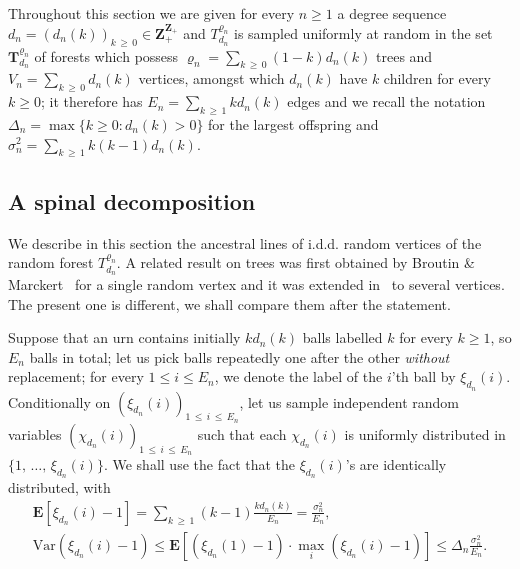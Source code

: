 \documentclass[10pt]{amsart}
\theoremstyle{definition}\newtheorem{defi}[theo]{Definition}\newtheorem{rema}[theo]{Remark}\newtheorem{exam}[theo]{Example}\newtheorem{exem}[theo]{Example}\newtheorem{nota}[theo]{Notation}
\newcommand{\ensembles}[1]{\mathbf{#1}}
\newcommand{\Z}{\ensembles{Z}}
\newcommand{\E}{\ensembles{E}}
\newcommand{\Es}[1]{\E\left[#1\right]}
\newcommand{\1}{\ensembles{1}}
\newcommand{\Tree}{\mathbf{T}}
\renewcommand{\le}{\leqslant}
\renewcommand{\ge}{\geqslant}
\newcommand{\Var}{\mathrm{Var}}
\newcommand{\Fn}{\Tree_{d_n}^{\varrho_n}}
\newcommand{\fn}{T_{d_n}^{\varrho_n}}
\newcommand{\edges}{E}
\newcommand{\vertices}{V}
\providecommand{\?}{}
\begin{document}
Throughout this section we are given for every $n \ge 1$ a degree sequence $d_n = (d_n(k))_{k\,\ge\,0} \in \Z_+^{\Z_+}$ and $\fn$ is sampled uniformly at random in the set $\Fn$ of forests which possess $\varrho_n = \sum_{k\,\ge\,0} (1-k) d_n(k)$ trees and $\vertices_n = \sum_{k\,\ge\,0} d_n(k)$ vertices, amongst which $d_n(k)$ have $k$ children for every $k \ge 0$; it therefore has $\edges_n = \sum_{k\,\ge\,1} k d_n(k)$ edges and we recall the notation $\Delta_n = \max\{k \ge 0 : d_n(k) > 0\}$ for the largest offspring and $\sigma_n^2 = \sum_{k \,\ge\,1} k (k-1) d_n(k)$.



\subsection{A spinal decomposition}\label{sec:epine}


We describe in this section the ancestral lines of i.d.d. random vertices of the random forest $\fn$. A related result on trees was first obtained by Broutin \& Marckert~\cite{BM14} for a single random vertex and it was extended in~\cite{Mar18b} to several vertices. The present one is different, we shall compare them after the statement.

Suppose that an urn contains initially $k d_n(k)$ balls labelled $k$ for every $k \ge 1$, so $\edges_n$ balls in total; let us pick balls repeatedly one after the other \emph{without} replacement; for every $1 \le i \le \edges_n$, we denote the label of the $i$'th ball by $\xi_{d_n}(i)$. Conditionally on $(\xi_{d_n}(i))_{1\,\le\, i\,\le\,\edges_n}$, let us sample independent random variables $(\chi_{d_n}(i))_{1\,\le\,i\,\le\,\edges_n}$ such that each $\chi_{d_n}(i)$ is uniformly distributed in $\{1,\,\dots,\,\xi_{d_n}(i)\}$. We shall use the fact that the $\xi_{d_n}(i)$'s are identically distributed, with
\begin{equation}\label{eq:moyenne_biais_par_la_taille}
\begin{gathered}
\Es{\xi_{d_n}(i) - 1} = \sum_{k\,\ge\,1} (k-1) \frac{k d_n(k)}{\edges_n} = \frac{\sigma_n^2}{\edges_n},
\\
\Var\left(\xi_{d_n}(i)-1\right) \le \Es{\left(\xi_{d_n}(1)-1\right) \cdot \max_i \left(\xi_{d_n}(i)-1\right)} \le \Delta_n \frac{\sigma_n^2}{\edges_n}.
\end{gathered}
\end{equation}
\end{document}
